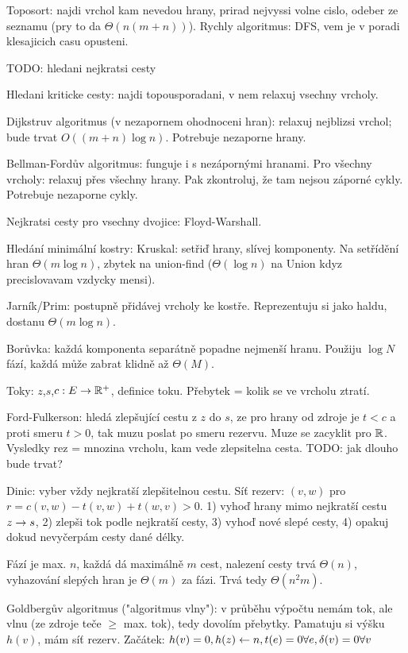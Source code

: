 Toposort: najdi vrchol kam nevedou hrany, prirad nejvyssi volne cislo, odeber
ze seznamu (pry to da $\Theta(n(m+n))$).
Rychly algoritmus: DFS, vem je v poradi klesajicich casu opusteni.

TODO: hledani nejkratsi cesty

Hledani kriticke cesty: najdi topousporadani, v nem relaxuj vsechny vrcholy.

Dijkstruv algoritmus (v nezapornem ohodnoceni hran):
relaxuj nejblizsi vrchol; bude trvat $O((m+n) \log n)$. Potrebuje nezaporne
hrany.

Bellman-Fordův algoritmus: funguje i s nezápornými hranami.
Pro všechny vrcholy: relaxuj přes všechny hrany.
Pak zkontroluj, že tam nejsou záporné cykly. Potrebuje nezaporne cykly.

Nejkratsi cesty pro vsechny dvojice: Floyd-Warshall.

Hledání minimální kostry: Kruskal: setřiď hrany, slívej komponenty.
Na setřídění hran $\Theta(m\log n)$, zbytek na union-find ($\Theta(\log n)$ na
Union kdyz precislovavam vzdycky mensi).

Jarník/Prim: postupně přidávej vrcholy ke kostře. Reprezentuju si jako
haldu, dostanu $\Theta(m\log n)$.

Borůvka: každá komponenta separátně popadne nejmenší hranu. Použiju $\log N$
fází, každá může zabrat klidně až $\Theta(M)$.

Toky: $z$,$s$,$c:E\rightarrow\mathbb{R}^+$, definice toku. Přebytek = kolik se ve vrcholu
ztratí.

Ford-Fulkerson: hledá zlepšující cestu z $z$ do $s$, ze pro hrany od zdroje je
$t<c$ a proti smeru $t>0$, tak muzu poslat po smeru rezervu. Muze se zacyklit
pro $\mathbb{R}$. Vysledky rez = mnozina vrcholu, kam vede zlepsitelna cesta.
TODO: jak dlouho bude trvat?

Dinic: vyber vždy nejkratší zlepšitelnou cestu. Síť rezerv: $(v,w)$ pro
$r=c(v,w)-t(v,w)+t(w,v)>0$.
1) vyhoď hrany mimo nejkratší cestu $z\rightarrow s$,
2) zlepši tok podle nejkratší cesty,
3) vyhoď nové slepé cesty,
4) opakuj dokud nevyčerpám cesty dané délky.

Fází je max. $n$, každá dá maximálně $m$ cest, nalezení cesty trvá $\Theta(n)$,
vyhazování slepých hran je $\Theta(m)$ za fázi. Trvá tedy $\Theta(n^2 m)$.

Goldbergův algoritmus ("algoritmus vlny"):
v průběhu výpočtu nemám tok, ale vlnu (ze zdroje teče $\geq$ max. tok),
tedy dovolím přebytky. Pamatuju si výšku $h(v)$, mám síť rezerv.
Začátek: $h(v)=0, h(z)\gets n, t(e)=0 \forall e, \delta(v)=0 \forall v$

